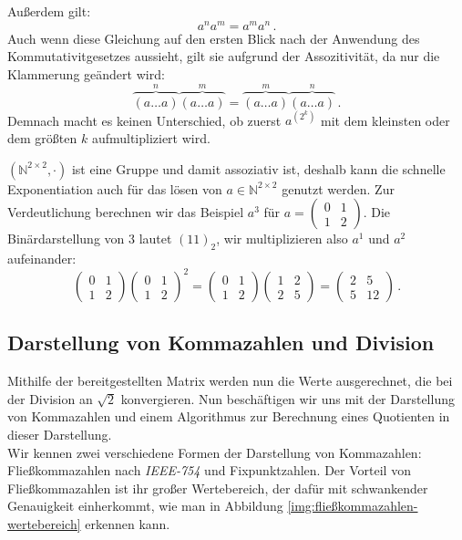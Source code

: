 \documentclass[course=erap]{aspdoc}
\begin{document}
Außerdem gilt:
\begin{equation}\label{swap_exponents}
      a^n a^m = a^m a^n \, .
\end{equation}
Auch wenn diese Gleichung auf den ersten Blick nach der Anwendung des Kommutativitgesetzes aussieht, gilt sie aufgrund der Assozitivität, da nur die Klammerung geändert wird:
\[ \overbrace{(a\dots a)}^n \overbrace{(a \dots a)}^m = \overbrace{(a \dots a)}^m \overbrace{(a \dots a)}^n \, .\]
Demnach macht es keinen Unterschied, ob zuerst $a^{(2^k)}$ mit dem kleinsten oder dem größten $k$ aufmultipliziert wird.\par
$(\mathbb{N}^{2\times 2}, \cdot)$ ist eine Gruppe und damit assoziativ ist, deshalb kann die schnelle Exponentiation auch für das lösen von $a\in\mathbb{N}^{2\times 2}$ genutzt werden.
Zur Verdeutlichung berechnen wir das Beispiel $a^3$ für $a = \left(\begin{matrix} 0 & 1 \\ 1 & 2 \end{matrix}\right)$. Die Binärdarstellung von $3$ lautet $(11)_2$, wir multiplizieren also $a^1$ und $a^2$ aufeinander: 
\begin{equation*} \label{eq:beispiel_matrixexp}
  \left(\begin{matrix} 0 & 1 \\ 1 & 2 \end{matrix}\right) \left(\begin{matrix} 0 & 1 \\ 1 & 2 \end{matrix}\right)^2 = \left(\begin{matrix} 0 & 1 \\ 1 & 2 \end{matrix}\right) \left(\begin{matrix} 1 & 2 \\ 2 & 5 \end{matrix}\right) = 
  \left(\begin{matrix} 2 & 5 \\ 5 & 12 \end{matrix}\right) \, .
\end{equation*}

\subsection{Darstellung von Kommazahlen und Division} \label{sec:division}
Mithilfe der bereitgestellten Matrix werden nun die Werte ausgerechnet, die bei der Division an $\sqrt{2}$ konvergieren.
Nun beschäftigen wir uns mit der Darstellung von Kommazahlen und einem Algorithmus zur Berechnung eines Quotienten in dieser Darstellung. \\
Wir kennen zwei verschiedene Formen der Darstellung von Kommazahlen: Fließkommazahlen nach \textit{IEEE-754} und Fixpunktzahlen.
Der Vorteil von Fließkommazahlen ist ihr großer Wertebereich, der dafür mit schwankender Genauigkeit einherkommt, wie man in Abbildung \ref{img:fließkommazahlen-wertebereich} erkennen kann.
\end{document}
